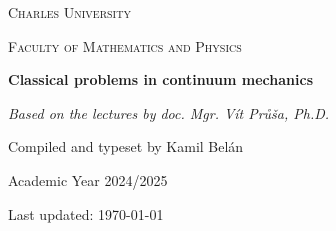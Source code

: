\documentclass[11pt]{scrartcl} %
\begin{document}
\begin{titlepage}
  \centering
  \vspace*{2cm}
  
  {\scshape\LARGE Charles University \par}
  \vspace{0.5cm}
  {\scshape\Large Faculty of Mathematics and Physics\par}
  \vspace{1.5cm}
  
  {\huge\bfseries Classical problems in continuum mechanics\par}
  \vspace{0.5cm}
  {\Large\itshape Based on the lectures by doc. Mgr. Vít Průša, Ph.D.\par}
  
  \vspace{2cm}
  
  \vfill
  
  {\large Compiled and typeset by Kamil Belán\par}
  \vspace{0.5cm}
  {\large Academic Year 2024/2025\par}
  \vspace{0.2cm}
  {\large Last updated: \today\par}
  
\end{titlepage}

\tableofcontents
\newpage 





\newpage
\printbibliography
\end{document}
